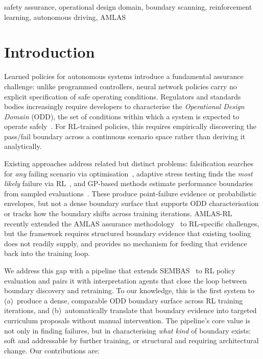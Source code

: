 \documentclass[conference]{IEEEtran}
\begin{document}
\begin{IEEEkeywords}
safety assurance, operational design domain, boundary scanning, reinforcement
learning, autonomous driving, AMLAS
\end{IEEEkeywords}

\section{Introduction}

Learned policies for autonomous systems introduce a fundamental assurance
challenge: unlike programmed controllers, neural network policies carry no
explicit specification of safe operating conditions. Regulators and standards
bodies increasingly require developers to characterise the
\emph{Operational Design Domain} (ODD), the set of conditions within which a
system is expected to operate safely~\cite{b7}. For RL-trained policies, this
requires empirically discovering the pass/fail boundary across a continuous
scenario space rather than deriving it analytically.

Existing approaches address related but distinct problems: falsification
searches for \emph{any} failing scenario via optimisation~\cite{b9},
adaptive stress testing finds the \emph{most likely} failure via
RL~\cite{b10}, and GP-based methods estimate performance boundaries from
sampled evaluations~\cite{b7,b8}. These produce point-failure evidence or
probabilistic envelopes, but not a dense boundary surface that supports ODD
characterisation or tracks how the boundary shifts across training iterations.
AMLAS-RL~\cite{b3} recently extended the AMLAS assurance
methodology~\cite{b4} to RL-specific challenges, but the framework requires
structured boundary evidence that existing tooling does not readily supply,
and provides no mechanism for feeding that evidence back into the training
loop.

We address this gap with a pipeline that extends SEMBAS~\cite{b1} to RL
policy evaluation and pairs it with interpretation agents that close the loop
between boundary discovery and retraining. To our knowledge, this is the first
system to (a)~produce a dense, comparable ODD boundary surface across RL
training iterations, and (b)~automatically translate that boundary evidence
into targeted curriculum proposals without manual intervention. The pipeline's
core value is not only in finding failures, but in characterising \emph{what
kind} of boundary exists: soft and addressable by further training, or
structural and requiring architectural change. Our contributions are:
\end{document}
